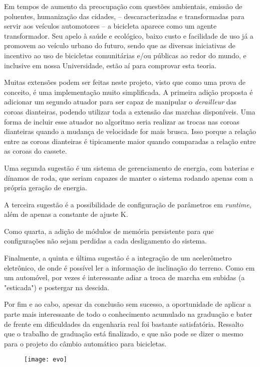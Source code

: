 \documentclass[a4paper,11pt]{article}
\begin{document}
Em tempos de aumento da preocupação com questões ambientais, emissão de
poluentes, humanização das cidades, -- descaracterizadas e transformadas para
servir aos veículos automotores -- a bicicleta aparece como um agente
transformador. Seu apelo à saúde e ecológico, baixo custo e facilidade de uso
já a promovem ao veículo urbano do futuro, sendo que as diversas iniciativas de
incentivo ao uso de bicicletas comunitárias e/ou públicas ao redor do mundo, e
inclusive em nossa Universidade, estão aí para comprovar esta teoria. 

Muitas extensões podem ser feitas neste projeto, visto que como uma prova de
conceito, é uma implementação muito simplificada. A primeira adição proposta
é adicionar um segundo atuador para ser capaz de manipular o
\textit{derailleur} das coroas dianteiras, podendo utilizar toda a extensão das
marchas disponíveis. Uma forma de incluir esse atuador no algoritmo seria
realizar as trocas nas coroas dianteiras quando a mudança de velocidade for
mais brusca. Isso porque a relação entre as coroas dianteiras é tipicamente
maior quando comparadas a relação entre as coroas do cassete.

Uma segunda sugestão é um sistema de gerenciamento de energia, com baterias e
dínamos de roda, que seriam capazes de manter o sistema rodando apenas com a
própria geração de energia.

A terceira sugestão é a possibilidade de configuração de parâmetros em
\textit{runtime}, além de apenas a constante de ajuste K.

Como quarta, a adição de módulos de memória persistente para
que configurações não sejam perdidas a cada desligamento do sistema.

Finalmente, a quinta e última sugestão é a integração de um acelerômetro
eletrônico, de onde é possível ler a informação de inclinação do terreno. Como
em um automóvel, por vezes é interessante adiar a troca de marcha em subidas (a
"esticada") e postergar na descida.

Por fim e ao cabo, apesar da conclusão sem sucesso, a oportunidade de aplicar a
parte mais interessante de todo o conhecimento acumulado na graduação e bater
de frente em dificuldades da engenharia real foi bastante satisfatória.
Ressalto que o trabalho de graduação está finalizado, e que não pode se dizer o
mesmo para o projeto do câmbio automático para bicicletas.

\begin{figure}[h!]
\begin{center}
 \texttt{[image: evo]}
\end{center}
\end{figure}
\end{document}
